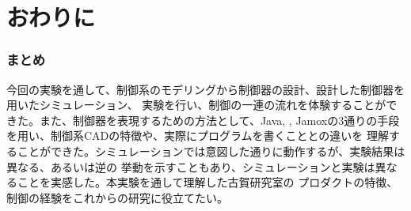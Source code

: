 \chapter{おわりに}
\subsection{まとめ}
今回の実験を通して、制御系のモデリングから制御器の設計、設計した制御器を用いたシミュレーション、
実験を行い、制御の一連の流れを体験することができた。また、制御器を表現するための方法として、Java,
\MaTX{}, Jamoxの3通りの手段を用い、制御系CADの特徴や、実際にプログラムを書くこととの違いを
理解することができた。シミュレーションでは意図した通りに動作するが、実験結果は異なる、あるいは逆の
挙動を示すこともあり、シミュレーションと実験は異なることを実感した。本実験を通して理解した古賀研究室の
プロダクトの特徴、制御の経験をこれからの研究に役立てたい。


